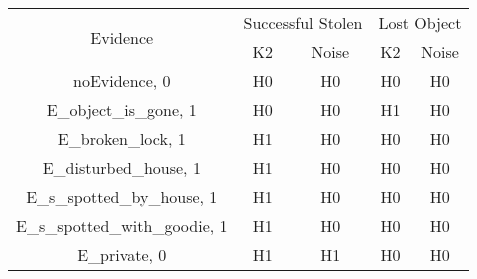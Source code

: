 \begin{table}
\begin{tabular}{ccccc}
\toprule
\multirow{2}{*}{Evidence} & \multicolumn{2}{c}{Successful Stolen} & \multicolumn{2}{c}{Lost Object} \\{}& { K2} & {Noise} & {K2} & {Noise} \\
\midrule
noEvidence, 0 & H0&H0&H0&H0\\
E\_object\_is\_gone, 1 & H0&H0&H1&H0\\
E\_broken\_lock, 1 & H1&H0&H0&H0\\
E\_disturbed\_house, 1 & H1&H0&H0&H0\\
E\_s\_spotted\_by\_house, 1 & H1&H0&H0&H0\\
E\_s\_spotted\_with\_goodie, 1 & H1&H0&H0&H0\\
E\_private, 0 & H1&H1&H0&H0\\
\bottomrule
\end{tabular}
\end{table}